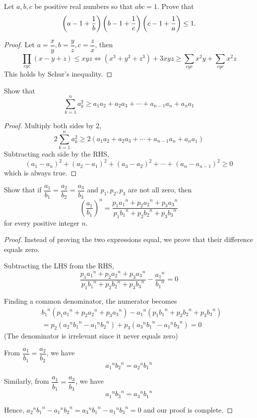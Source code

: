 \begin{prbm}[IMO 2000]
Let $ a, b, c$ be positive real numbers so that $abc = 1$. Prove that
\[ \left(a-1+\frac{1}{b}\right) \left(b-1+\frac{1}{c}\right) \left(c-1+\frac{1}{a}\right) \le 1. \]
\end{prbm}

\begin{proof}
Let $a=\dfrac{x}{y}, b=\dfrac{y}{z}, c=\dfrac{z}{x}$, then
\[ \prod_{cyc}(x-y+z)\le xyz \iff (x^3+y^3+z^3)+3xyz \ge \sum_{cyc}x^2y+\sum_{cyc}x^2z \]
This holds by Schur's inequality.
\end{proof}
\pagebreak

\begin{prbm}
Show that 
\[ \sum_{k=1}^{n}a_k^2 \ge a_1 a_2 + a_2a_3 + \cdots + a_{n-1}a_n + a_na_1 \]
\end{prbm}

\begin{proof}
Multiply both sides by $2$,
\[ 2\sum_{k=1}^{n}a_{k}^{2}\ge 2(a_{1}a_{2}+a_{2}a_{3}+\cdots+a_{n-1}a_{n}+a_{n}a_{1}) \]
Subtracting each side by the RHS, 
\[ (a_1-a_n)^2+(a_2-a_1)^2+(a_3-a_2)^2+\cdots+(a_n-a_{n-1})^2\ge 0 \]
which is always true.
\end{proof}
\pagebreak

\begin{prbm}[CANADA/1969]
Show that if $\dfrac{a_1}{b_1} = \dfrac{a_2}{b_2} = \dfrac{a_3}{b_3}$ and $p_1,p_2,p_3$ are not all zero, then 
\[ \left(\frac{a_1}{b_1} \right)^n = \frac{p_1{a_1}^n + p_2{a_2}^n + p_3{a_3}^n}{p_1{b_1}^n + p_2{b_2}^n + p_3{b_3}^n}\]
for every positive integer $n$.
\end{prbm}

\begin{proof}
Instead of proving the two expressions equal, we prove that their difference equals zero.

Subtracting the LHS from the RHS, 
\[ \frac{p_1{a_1}^n+p_2{a_2}^n+p_3{a_3}^n}{p_1{b_1}^n+p_2{b_2}^n+p_3{b_3}^n}-\frac{{a_1}^n}{{b_1}^n} = 0\]

Finding a common denominator, the numerator becomes 
\begin{align*}
&{b_1}^n (p_1{a_1}^n + p_2{a_2}^n + p_3{a_3}^n) - {a_1}^n(p_1{b_1}^n + p_2{b_2}^n + p_3{b_3}^n) \\
&= p_2({a_2}^n {b_1}^n - {a_1}^n {b_2}^n) + p_3({a_3}^n {b_1}^n - {a_1}^n {b_3}^n) = 0
\end{align*}
(The denominator is irrelevant since it never equals zero)

From $\dfrac{a_1}{b_1}=\dfrac{a_2}{b_2}$, we have 
\[ {a_1}^n {b_2}^n = {a_2}^n {b_1}^n \]

Similarly, from $\dfrac{a_1}{b_1}=\dfrac{a_3}{b_3}$, we have 
\[ {a_1}^n {b_3}^n = {a_3}^n {b_1}^n \]

Hence, ${a_2}^n {b_1}^n - {a_1}^n {b_2}^n = {a_3}^n {b_1}^n - {a_1}^n {b_3}^n = 0$ and our proof is complete.
\end{proof}

